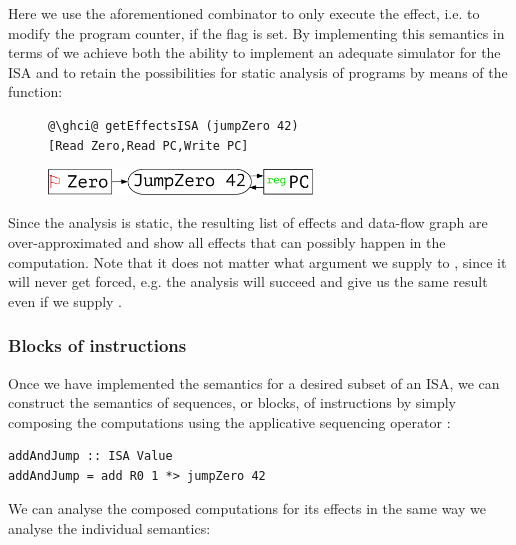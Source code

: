 Here we use the aforementioned  combinator to only execute the effect, i.e.
to modify the program counter, if the flag is set. By implementing this semantics in terms of
 we achieve both the ability to implement an adequate simulator for the ISA and
to retain the possibilities for static analysis of programs by means of the 
function:

\begin{figure}[!h]
 \begin{minipage}{0.45\textwidth}
\raggedleft
\begin{verbatim}
@\ghci@ getEffectsISA (jumpZero 42)
[Read Zero,Read PC,Write PC]
\end{verbatim}
 \end{minipage}
 \begin{minipage}{0.45\textwidth}
  \centering
  \includegraphics[width=7cm]{./fig/jumpZero.pdf}
 \end{minipage}
\end{figure}

Since the analysis is static, the resulting list of effects and data-flow graph are
over-approximated and show all effects that can possibly happen in the computation.
Note that it does not matter what argument we supply to , since it will
never get forced, e.g. the analysis will succeed and give us the same result even
if we supply .

\subsubsection{\textbf{Blocks of instructions}}

Once we have implemented the semantics for a desired subset of an ISA, we can construct the
semantics of sequences, or blocks, of instructions by simply composing the  computations
using the applicative sequencing operator \hs{*>}:

\begin{verbatim}
addAndJump :: ISA Value
addAndJump = add R0 1 *> jumpZero 42
\end{verbatim}

We can analyse the composed computations for its effects in the same way we analyse the
individual semantics:

